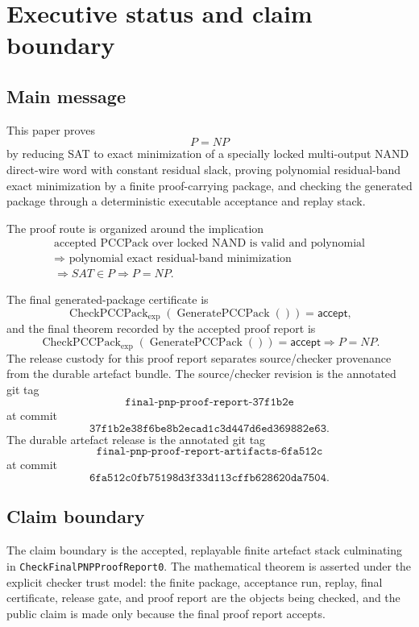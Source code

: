 \documentclass[10.5pt,a4paper]{article}
\newcommand{\CheckPack}{\operatorname{CheckPCCPack}_{\exp}}
\newcommand{\GenPack}{\operatorname{GeneratePCCPack}}
\begin{document}
\tableofcontents
\newpage

\section{Executive status and claim boundary}

\subsection{Main message}
This paper proves
\[
P=NP
\]
by reducing SAT to exact minimization of a specially locked multi-output NAND direct-wire word with constant residual slack, proving polynomial residual-band exact minimization by a finite proof-carrying package, and checking the generated package through a deterministic executable acceptance and replay stack.

The proof route is organized around the implication
\[
\begin{gathered}
\text{accepted PCCPack over locked NAND is valid and polynomial}\\
\Longrightarrow\text{ polynomial exact residual-band minimization}\\
\Longrightarrow SAT\in P\Longrightarrow P=NP.
\end{gathered}
\]

The final generated-package certificate is
\[
\CheckPack(\GenPack())=\mathsf{accept},
\]
and the final theorem recorded by the accepted proof report is
\[
\CheckPack(\GenPack())=\mathsf{accept}\Longrightarrow P=NP.
\]
The release custody for this proof report separates source/checker provenance from the durable artefact bundle.  The source/checker revision is the annotated git tag
\[
\texttt{final-pnp-proof-report-37f1b2e}
\]
at commit
\[
\texttt{37f1b2e38f6be8b2ecad1c3d447d6ed369882e63}.
\]
The durable artefact release is the annotated git tag
\[
\texttt{final-pnp-proof-report-artifacts-6fa512c}
\]
at commit
\[
\texttt{6fa512c0fb75198d3f33d113cffb628620da7504}.
\]

\subsection{Claim boundary}
The claim boundary is the accepted, replayable finite artefact stack culminating in \texttt{CheckFinalPNPProofReport0}.  The mathematical theorem is asserted under the explicit checker trust model: the finite package, acceptance run, replay, final certificate, release gate, and proof report are the objects being checked, and the public claim is made only because the final proof report accepts.
\end{document}
